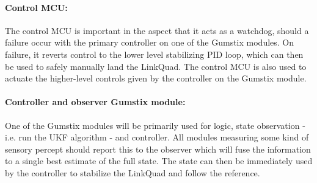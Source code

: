         \paragraph{Control MCU: } The control MCU is important in the aspect
        that it acts as a watchdog, should a failure occur with the primary
        controller on one of the Gumstix\textsuperscript{\textregistered} modules.
        On failure, it reverts control to the lower level stabilizing PID loop,
        which can then be used to safely manually land the LinkQuad.
        The control MCU is also used to actuate the higher-level controls 
        given by the controller on the Gumstix\textsuperscript{\textregistered} module.
        
    

        \paragraph{Controller and observer Gumstix\textsuperscript{\textregistered} module: }
        One of the Gumstix\textsuperscript{\textregistered} modules will be primarily
        used for logic, state observation - i.e. run the UKF algorithm - and
        controller. All modules measuring some kind of sensory percept
        should report this to the observer which will fuse the information
        to a single best estimate of the full state. The state can then
        be immediately used by the controller to stabilize the LinkQuad
        and follow the reference.

